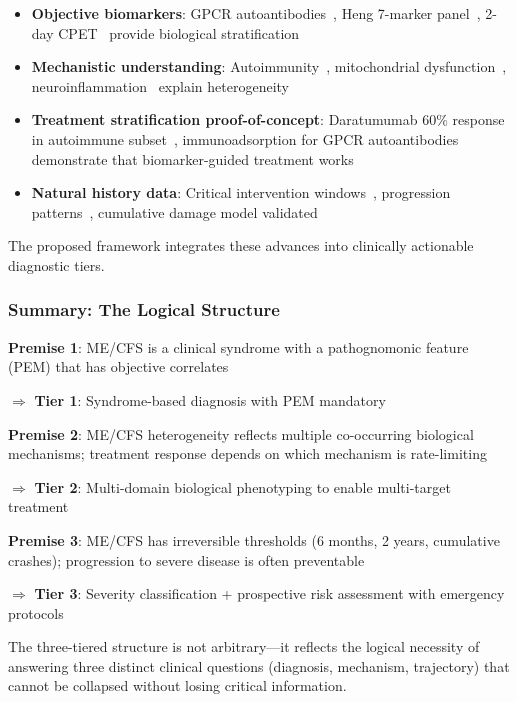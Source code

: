 \begin{itemize}
    \item \textbf{Objective biomarkers}: GPCR autoantibodies~\cite{Loebel2016,Bynke2020}, Heng 7-marker panel~\cite{heng2025mecfs}, 2-day CPET~\cite{Lim2020,keller2024cpet} provide biological stratification
    \item \textbf{Mechanistic understanding}: Autoimmunity~\cite{Fluge2025daratumumab}, mitochondrial dysfunction~\cite{wang2023wasf3,Syed2025}, neuroinflammation~\cite{Nakatomi2014neuroinflammation} explain heterogeneity
    \item \textbf{Treatment stratification proof-of-concept}: Daratumumab 60\% response in autoimmune subset~\cite{Fluge2025daratumumab}, immunoadsorption for GPCR autoantibodies~\cite{Stein2024immunoadsorption} demonstrate that biomarker-guided treatment works
    \item \textbf{Natural history data}: Critical intervention windows~\cite{Maksoud2020natural}, progression patterns~\cite{Chu2019}, cumulative damage model validated
\end{itemize}

The proposed framework integrates these advances into clinically actionable diagnostic tiers.

\subsubsection{Summary: The Logical Structure}

\begin{observation}
\textbf{Premise 1}: ME/CFS is a clinical syndrome with a pathognomonic feature (PEM) that has objective correlates

$\Rightarrow$ \textbf{Tier 1}: Syndrome-based diagnosis with PEM mandatory

\vspace{0.5em}

\textbf{Premise 2}: ME/CFS heterogeneity reflects multiple co-occurring biological mechanisms; treatment response depends on which mechanism is rate-limiting

$\Rightarrow$ \textbf{Tier 2}: Multi-domain biological phenotyping to enable multi-target treatment

\vspace{0.5em}

\textbf{Premise 3}: ME/CFS has irreversible thresholds (6 months, 2 years, cumulative crashes); progression to severe disease is often preventable

$\Rightarrow$ \textbf{Tier 3}: Severity classification + prospective risk assessment with emergency protocols

\vspace{0.5em}

The three-tiered structure is not arbitrary---it reflects the logical necessity of answering three distinct clinical questions (diagnosis, mechanism, trajectory) that cannot be collapsed without losing critical information.
\end{observation}

